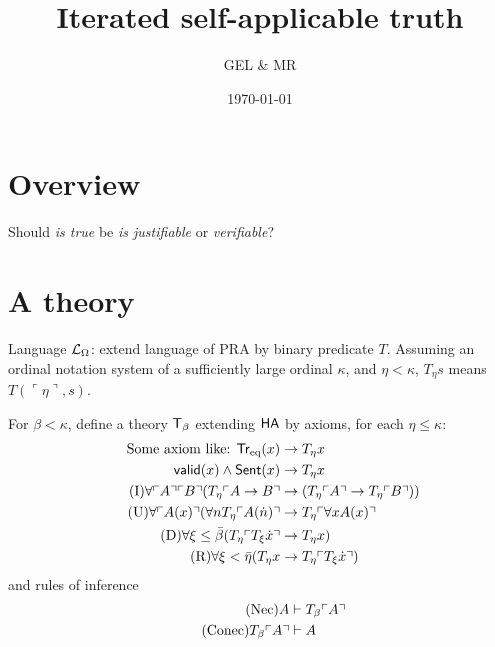 \documentclass[UKenglish,cleveref,DIV=12]{scrartcl}
\title{Iterated self-applicable truth}
\author{GEL \& MR}
\date{\today}
\theoremstyle{definition}
\theoremstyle{definition}
\begin{document}
\maketitle

\tableofcontents



\section{Overview}
Should \emph{is true} be \emph{is justifiable} or \emph{verifiable}?

\section{A theory}

Language \( \mathcal{L}_\Omega \): extend language of PRA by binary predicate \( T \).
Assuming an ordinal notation system of a sufficiently large ordinal \( \kappa \), and \( \eta < \kappa \), \( T_\eta s \) means \( T( \ulcorner \eta \urcorner , s ) \).

For \( \beta < \kappa \), define a theory \( \mathsf{T}_\beta \) extending \( \mathsf{HA} \) by axioms, for each \( \eta \le \kappa \):
\begin{align*}
\text{Some axiom like: } \mathsf{Tr}_\textrm{eq}( x ) &\rightarrow T_\eta x 
\\
\mathsf{valid}( x ) \wedge \mathsf{Sent}(x) &\rightarrow T_\eta x 
\\
\tag{I}
	\forall \ulcorner{A}\urcorner \ulcorner{B}\urcorner ( T_\eta \ulcorner{ A \rightarrow B}\urcorner &\rightarrow ( T_\eta \ulcorner{A}\urcorner \rightarrow T_\eta \ulcorner{B}\urcorner ) )
	\\
\tag{U}
	\forall \ulcorner{A(x)}\urcorner( \forall n T_\eta  \ulcorner{ A(\dot n)}\urcorner &\rightarrow T_\eta \ulcorner{ \forall x A(x) }\urcorner
	\\
\tag{D}
	\forall \xi \le \bar \beta ( T_\eta \ulcorner{ T_\xi \dot x }\urcorner &\rightarrow T_\eta x )
	\\
\tag{R}
	\forall \xi < \bar \eta ( T_\eta x &\rightarrow T_\eta \ulcorner{ T_\xi \dot x }\urcorner)
\end{align*}
%
and rules of inference
\begin{align*}
	\tag{Nec}
	A &\vdash T_\beta \ulcorner{A}\urcorner
	\\
	\tag{Conec}
	T_\beta \ulcorner{A}\urcorner &\vdash A
\end{align*}
\end{document}
